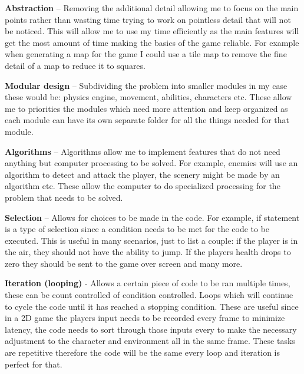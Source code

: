 \documentclass{article}
\newcommand{\parBr}{\vspace{5mm}}%
\begin{document}
\parBr

\textbf{Abstraction} – Removing the additional detail allowing me to focus on the main points rather than wasting time trying to work on pointless detail that will not be noticed. This will allow me to use my time efficiently as the main features will get the most amount of time making the basics of the game reliable. For example when generating a map for the game I could use a tile map to remove the fine detail of a map to reduce it to squares.

\parBr

\textbf{Modular design} – Subdividing the problem into smaller modules in my case these would be: physics engine, movement, abilities, characters etc. These allow me to priorities the modules which need more attention and keep organized as each module can have its own separate folder for all the things needed for that module.

\parBr

\textbf{Algorithms} – Algorithms allow me to implement features that do not need anything but computer processing to be solved. For example, enemies will use an algorithm to detect and attack the player, the scenery might be made by an algorithm etc. These allow the computer to do specialized processing for the problem that needs to be solved.

\parBr

\textbf{Selection} – Allows for choices to be made in the code. For example, if statement is a type of selection since a condition needs to be met for the code to be executed. This is useful in many scenarios, just to list a couple: if the player is in the air, they should not have the ability to jump. If the players health drops to zero they should be sent to the game over screen and many more.

\parBr

\textbf{Iteration (looping)} - Allows a certain piece of code to be ran multiple times, these can be count controlled of condition controlled. Loops which will continue to cycle the code until it has reached a stopping condition. These are useful since in a 2D game the players input needs to be recorded every frame to minimize latency, the code needs to sort through those inputs every to make the necessary adjustment to the character and environment all in the same frame. These tasks are repetitive therefore the code will be the same every loop and iteration is perfect for that.

\parBr
\end{document}
